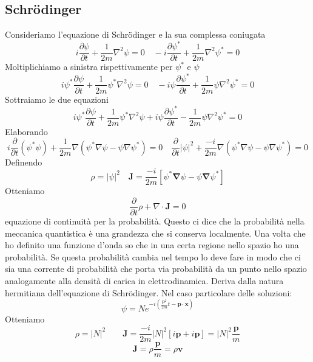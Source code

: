 \subsection{Schr\"odinger}
Consideriamo l'equazione di Schr\"odinger e la sua complessa coniugata
$$
i \frac{\partial \psi}{\partial t}+\frac{1}{2 m} \nabla^2 \psi=0 \quad-i \frac{\partial \psi^*}{\partial t}+\frac{1}{2 m} \nabla^2 \psi^*=0
$$
Moltiplichiamo a sinistra rispettivamente per $\psi^*$ e $\psi$
$$
i \psi^* \frac{\partial \psi}{\partial t}+\frac{1}{2 m} \psi^* \nabla^2 \psi=0 \quad-i \psi \frac{\partial \psi^*}{\partial t}+\frac{1}{2 m} \psi \nabla^2 \psi^*=0
$$
Sottraiamo le due equazioni
$$
i \psi^* \frac{\partial \psi}{\partial t}+\frac{1}{2 m} \psi^* \nabla^2 \psi+i \psi \frac{\partial \psi^*}{\partial t}-\frac{1}{2 m} \psi \nabla^2 \psi^*=0
$$
Elaborando
$$
i \frac{\partial}{\partial t}\left(\psi^* \psi\right)+\frac{1}{2 m} \nabla\left(\psi^* \nabla \psi-\psi \nabla \psi^*\right)=0 \quad \frac{\partial}{\partial t}|\psi|^2+\frac{-i}{2 m} \nabla\left(\psi^* \nabla \psi-\psi \nabla \psi^*\right)=0
$$
Definendo
$$
\rho=|\psi|^2 \quad \mathbf{J}=\frac{-i}{2 m}\left[\psi^* \boldsymbol{\nabla} \psi-\psi \boldsymbol{\nabla} \psi^*\right]
$$
Otteniamo
$$
\frac{\partial}{\partial t} \rho+\nabla \cdot \mathbf{J}=0
$$
equazione di continuità per la probabilità. Questo ci dice che la probabilità nella meccanica quantistica è una grandezza che si conserva localmente. Una volta che ho definito una funzione d'onda so che in una certa regione nello spazio ho una probabilità. Se questa probabilità cambia nel tempo lo deve fare in modo che ci sia una corrente di probabilità che porta via probabilità da un punto nello spazio analogamente alla densità di carica in elettrodinamica. Deriva dalla natura hermitiana dell'equazione di Schr\"odinger. Nel caso particolare delle soluzioni:
\begin{equation*}
    \psi=Ne^{-i\left(\frac{\mathbf{p}^2}{2m}t-\mathbf{p}\cdot\mathbf{x}\right)}
\end{equation*}
Otteniamo
\begin{equation*}
    \rho=|N|^2 \qquad \mathbf{J}=\frac{-i}{2m}|N|^2[i\mathbf{p}+i\mathbf{p}]=|N|^2\frac{\mathbf{p}}{m}
\end{equation*}
\begin{equation*}
    \mathbf{J}=\rho\frac{\mathbf{p}}{m}=\rho\mathbf{v}
\end{equation*}
